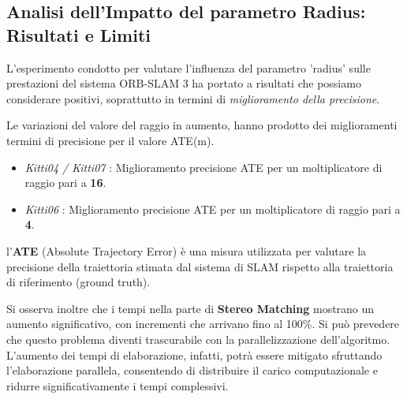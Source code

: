 \documentclass[12pt,a4paper]{report}
\begin{document}
\vspace{4cm}

\subsection{Analisi dell'Impatto del parametro Radius: Risultati e Limiti}

L'esperimento condotto per valutare l'influenza del parametro 'radius' sulle prestazioni del sistema ORB-SLAM 3 ha portato a risultati che possiamo considerare positivi, soprattutto in termini di \textit{miglioramento della precisione}.

Le variazioni del valore del raggio in aumento, hanno prodotto dei miglioramenti termini di precisione per il valore ATE(m).

\begin{itemize}
    \item \textit{Kitti04 / Kitti07} : Miglioramento precisione ATE per un moltiplicatore di raggio pari a \textbf{16}.
    \item \textit{Kitti06} : Miglioramento precisione ATE per un moltiplicatore di raggio pari a \textbf{4}.
\end{itemize}

l'\textbf{ATE} (Absolute Trajectory Error) è una misura utilizzata per valutare la precisione della traiettoria stimata dal sistema di SLAM rispetto alla traiettoria di riferimento (ground truth).

Si osserva inoltre che i tempi nella parte di \textbf{Stereo Matching} mostrano un aumento significativo, con incrementi che arrivano fino al 100\%. Si può prevedere che questo problema diventi trascurabile con la parallelizzazione dell'algoritmo. L'aumento dei tempi di elaborazione, infatti, potrà essere mitigato sfruttando l'elaborazione parallela, consentendo di distribuire il carico computazionale e ridurre significativamente i tempi complessivi.
\end{document}

